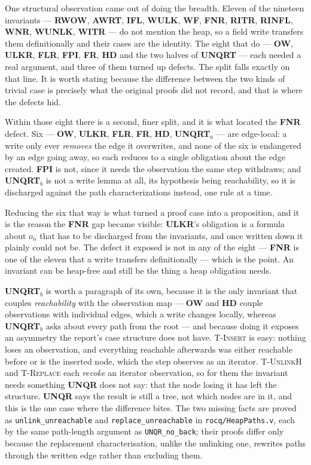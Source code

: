 One structural observation came out of doing the breadth.  Eleven of the nineteen
invariants --- \textbf{RWOW}, \textbf{AWRT}, \textbf{IFL}, \textbf{WULK},
\textbf{WF}, \textbf{FNR}, \textbf{RITR}, \textbf{RINFL}, \textbf{WNR},
\textbf{WUNLK}, \textbf{WITR} --- do not mention the heap, so a field write
transfers them definitionally and their cases are the identity.  The eight that do --- \textbf{OW}, \textbf{ULKR},
\textbf{FLR}, \textbf{FPI}, \textbf{FR}, \textbf{HD} and the two halves of
\textbf{UNQRT} --- each needed a real argument, and three of them turned up
defects.  The split falls exactly on that line.  It is worth stating because the
difference between the two kinds of trivial case is precisely what the original
proofs did not record, and that is where the defects hid.

Within those eight there is a second, finer split, and it is what located the
\textbf{FNR} defect.  Six --- \textbf{OW}, \textbf{ULKR}, \textbf{FLR},
\textbf{FR}, \textbf{HD}, \textbf{UNQRT}$_a$ --- are edge-local: a write only
ever \emph{removes} the edge it overwrites, and none of the six is endangered
by an edge going away, so each reduces to a single obligation about the edge
created.  \textbf{FPI} is not, since it needs the observation the same step
withdraws; and \textbf{UNQRT}$_b$ is not a write lemma at all, its hypothesis
being reachability, so it is discharged against the path characterizations
instead, one rule at a time.

Reducing the six that way is what turned a proof case into a proposition, and
it is the reason the \textbf{FNR} gap became visible: \textbf{ULKR}'s
obligation is a formula about $o_n$ that has to be discharged from the
invariants, and once written down it plainly could not be.  The defect it
exposed is not in any of the eight --- \textbf{FNR} is one of the eleven that a
write transfers definitionally --- which is the point.  An invariant can be
heap-free and still be the thing a heap obligation needs.

\textbf{UNQRT}$_b$ is worth a paragraph of its own, because it is the only
invariant that couples \emph{reachability} with the observation map --- \textbf{OW}
and \textbf{HD} couple observations with individual edges, which a write changes
locally, whereas \textbf{UNQRT}$_b$ asks about every path from the root --- and because
doing it exposes an asymmetry the report's case structure does not have.
\textsc{T-Insert} is easy: nothing loses an observation, and everything
reachable afterwards was either reachable before or is the inserted node, which
the step observes as an iterator.  \textsc{T-UnlinkH} and \textsc{T-Replace}
each \emph{revoke} an iterator observation, so for them the invariant needs
something \textbf{UNQR} does not say: that the node losing it has left the
structure.  \textbf{UNQR} says the result is still a tree, not which nodes are
in it, and this is the one case where the difference bites.  The two missing
facts are proved as \texttt{unlink\_unreachable} and
\texttt{replace\_unreachable} in \texttt{rocq/HeapPaths.v}, each by the same
path-length argument as \texttt{UNQR\_no\_back}; their proofs differ only
because the replacement characterisation, unlike the unlinking one, rewrites
paths through the written edge rather than excluding them.

